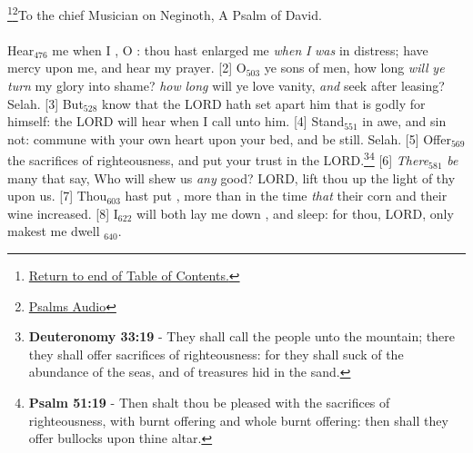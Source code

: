 \footnote{\textcolor[cmyk]{0.99998,1,0,0}{\hyperlink{TOC}{Return to end of Table of Contents.}}}\footnote{\href{https://audiobible.com/bible/bible.html}{\textcolor[cmyk]{0.99998,1,0,0}{Psalms Audio}}}\textcolor[cmyk]{0.99998,1,0,0}{To the chief Musician on Neginoth, A Psalm of David.}\\
\\
\textcolor[cmyk]{0.99998,1,0,0}{Hear\textcolor{jungle}{$_{476}$} me when I , O : thou hast enlarged me \emph{when} \emph{I} \emph{was} in distress; have mercy upon me, and hear my prayer.}
[2] \textcolor[cmyk]{0.99998,1,0,0}{O\textcolor{jungle}{$_{503}$} ye sons of men, how long \emph{will} \emph{ye} \emph{turn} my glory into shame? \emph{how} \emph{long} will ye love vanity, \emph{and} seek after leasing? Selah.}
[3] \textcolor[cmyk]{0.99998,1,0,0}{But\textcolor{jungle}{$_{528}$} know that the LORD hath set apart him that is godly for himself: the LORD will hear when I call unto him.}
[4] \textcolor[cmyk]{0.99998,1,0,0}{Stand\textcolor{jungle}{$_{551}$} in awe, and sin not: commune with your own heart upon your bed, and be still. Selah.}
[5] \textcolor[cmyk]{0.99998,1,0,0}{Offer\textcolor{jungle}{$_{569}$} the sacrifices of righteousness, and put your trust in the LORD.}\footnote{\textbf{Deuteronomy 33:19} - They shall call the people unto the mountain; there they shall offer sacrifices of righteousness: for they shall suck of the abundance of the seas, and of treasures hid in the sand.}\footnote{\textbf{Psalm 51:19} - Then shalt thou be pleased with the sacrifices of righteousness, with burnt offering and whole burnt offering: then shall they offer bullocks upon thine altar.}
[6] \textcolor[cmyk]{0.99998,1,0,0}{\emph{There}\textcolor{jungle}{$_{581}$} \emph{be} many that say, Who will shew us \emph{any} good? LORD, lift thou up the light of thy  upon us.}
[7] \textcolor[cmyk]{0.99998,1,0,0}{Thou\textcolor{jungle}{$_{603}$} hast put , more than in the time \emph{that} their corn and their wine increased.}
[8] \textcolor[cmyk]{0.99998,1,0,0}{I\textcolor{jungle}{$_{622}$} will both lay me down , and sleep: for thou, LORD, only makest me dwell \textcolor{jungle}{$_{640}$}.}



